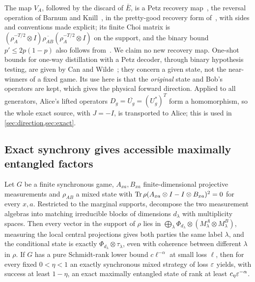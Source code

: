The map $V_A$, followed by the discard of $\bar E$, is a Petz recovery map~\cite{Petz86}, the reversal operation of Barnum and
Knill~\cite{BK02}, in the pretty-good recovery form of~\cite[App.~A.1]{BCW14}, with sides and conventions made explicit; its finite
Choi matrix is $(\rho_A^{-T/2}\otimes I)\overline{\rho_{AB}}(\rho_A^{-T/2}\otimes I)$ on the support, and the binary bound
$p'\le2p(1-p)$ also follows from~\cite[(12)]{Ren17}. We claim no new recovery map. One-shot bounds for one-way distillation with a
Petz decoder, through binary hypothesis testing, are given by Can and Wilde~\cite{CW26}; they concern a given state, not the
near-winners of a fixed game. Its use here is that the
\emph{original} state and Bob's operators are kept, which gives the physical forward direction. Applied to all
generators, Alice's lifted operators $D_g=\overline{U_g}=(U_g^*)^T$ form a homomorphism, so the whole exact source, with
$J=-I$, is transported to Alice; this is used in \cref{sec:direction,sec:exact}.

\subsection{Exact synchrony gives accessible maximally entangled factors}\label{sec:exact-sync}

\begin{theorem}\label{thm:exact-sync}
Let $G$ be a finite synchronous game, $A_{xa},B_{xa}$ finite-dimensional projective measurements and $\rho_{AB}$ a mixed
state with $\operatorname{Tr}\rho(A_{xa}\otimes I-I\otimes B_{xa})^2=0$ for every $x,a$. Restricted to the marginal supports, decompose the
two measurement algebras into matching irreducible blocks of dimensions $d_\lambda$ with multiplicity spaces. Then every
vector in the support of $\rho$ lies in $\bigoplus_\lambda\Phi_{d_\lambda}\otimes(M^A_\lambda\otimes M^B_\lambda)$, measuring the
local central projections gives both parties the same label $\lambda$, and the conditional state is exactly
$\Phi_{d_\lambda}\otimes\tau_\lambda$, even with coherence between different $\lambda$ in $\rho$. If $G$ has a pure Schmidt-rank
lower bound $c\ell^{-\alpha}$ at small loss $\ell$, then for every fixed $0<\eta<1$ an exactly synchronous mixed strategy of
loss $\varepsilon$ yields, with success at least $1-\eta$, an exact maximally entangled state of rank at least $c_\eta\varepsilon^{-\alpha}$.
\end{theorem}

